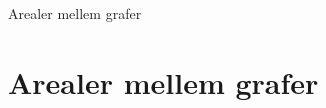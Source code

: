 \documentclass[12pt]{article}
\begin{document}





\begin{center}
\Huge
Arealer mellem grafer
\end{center}

\section*{Arealer mellem grafer}
\end{document}
